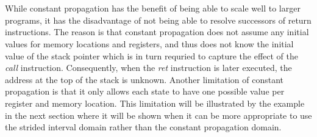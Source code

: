 \documentclass{kththesis}
\renewcommand{\it}[1]{\textit{#1}}
\begin{document}
\\ \\
While constant propagation has the benefit of being able to scale well to larger programs\cite{alternating}, it has the disadvantage of not being able to resolve successors of return instructions. The reason is that constant propagation does not assume any initial values for memory locations and registers, and thus does not know the initial value of the stack pointer which is in turn requried to capture the effect of the \it{call} instruction. Consequently, when the \it{ret} instruction is later executed, the address at the top of the stack is unknown. Another limitation of constant propagation is that it only allows each state to have one possible value per register and memory location. This limitation will be illustrated by the example in the next section where it will be shown when it can be more appropriate to use the strided interval domain rather than the constant propagation domain.
\end{document}
